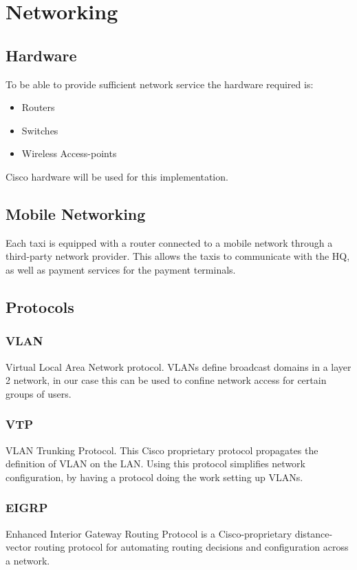 \section{Networking}
\subsection{Hardware}
To be able to provide sufficient network service the hardware required is:
    \begin{itemize}[noitemsep]  
        \item Routers
        \item Switches
        \item Wireless Access-points
    \end{itemize}
Cisco hardware will be used for this implementation.    


\subsection{Mobile Networking}
Each taxi is equipped with a router connected to a mobile network through a third-party network provider.
This allows the taxis to communicate with the HQ, as well as payment services for the payment terminals.

\subsection{Protocols}
\subsubsection{VLAN}
Virtual Local Area Network protocol.
VLANs define broadcast domains in a layer 2 network, \cite{VLAN} in our case this can be used to confine network access for certain groups of users.

\subsubsection{VTP}
VLAN Trunking Protocol.
This Cisco proprietary protocol propagates the definition of VLAN on the LAN.\cite{VTP} 
Using this protocol simplifies network configuration, by having a protocol doing the work setting up VLANs.

\subsubsection{EIGRP}
Enhanced Interior Gateway Routing Protocol is a Cisco-proprietary distance-vector routing protocol for automating routing decisions and configuration across a network. \cite{EIGRP}

